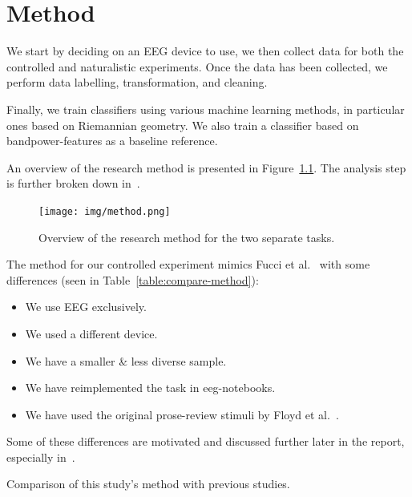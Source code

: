 \chapter{Method}

We start by deciding on an EEG device to use, we then collect data for both the controlled and naturalistic experiments. Once the data has been collected, we perform data labelling, transformation, and cleaning. 

Finally, we train classifiers using various machine learning methods, in particular ones based on Riemannian geometry. We also train a classifier based on bandpower-features as a baseline reference.

An overview of the research method is presented in Figure~\ref{fig:method}. The analysis step is further broken down in~.

\begin{figure}[h]
    \centering
    \texttt{[image: img/method.png]}
    \caption{Overview of the research method for the two separate tasks.}\label{fig:method}
\end{figure}

\begin{minipage}{\textwidth}
The method for our controlled experiment mimics Fucci et al.~\cite{fucci_replication_2019} with some differences (seen in Table~\ref{table:compare-method}): 

\begin{itemize}
        \item We use EEG exclusively.
        \item We used a different device.
        \item We have a smaller \& less diverse sample.
        \item We have reimplemented the task in eeg-notebooks.
        \item We have used the original prose-review stimuli by Floyd et al.~\cite{floyd_decoding_2017}.
\end{itemize}

    Some of these differences are motivated and discussed further later in the report, especially in~.
\end{minipage}

\begin{landscape}
    \begin{table}
        \centering
        
        \caption{Comparison of this study's method with previous studies.}\label{table:compare-method}
    \end{table}
\end{landscape}

